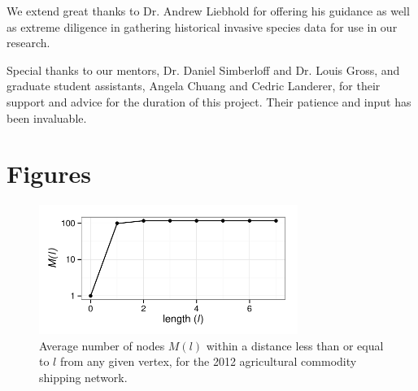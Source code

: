 \documentclass[12pt]{article}
\begin{document}
We extend great thanks to Dr. Andrew Liebhold for offering his guidance as well as extreme diligence in gathering historical invasive species data for use in our research.

Special thanks to our mentors, Dr. Daniel Simberloff and Dr. Louis Gross, and graduate student assistants, Angela Chuang and Cedric Landerer, for their support and advice for the duration of this project.  Their patience and input has been invaluable. 




\section*{Figures}

\begin{figure}[h]
	\centering
	\includegraphics[width=0.75\textwidth]{length_plot.pdf}
	\caption{Average number of nodes $M(l)$ within a distance less than or equal to $l$ from any given vertex, for the 2012 agricultural commodity shipping network.}
	\label{fig:plot length}
\end{figure}
\end{document}
